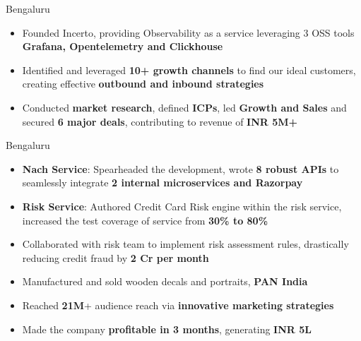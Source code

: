 \documentclass[10pt,a4paper]{altacv}
\begin{document}
  {Bengaluru}
\begin{itemize}
\item Founded Incerto, providing Observability as a service leveraging 3 OSS tools \textbf{Grafana, Opentelemetry and Clickhouse}
\item Identified and leveraged \textbf{10+ growth channels} to find our ideal customers, creating effective \textbf{outbound and inbound strategies}
\item Conducted \textbf{market research}, defined \textbf{ICPs}, led \textbf{Growth and Sales} and secured \textbf{6 major deals}, contributing to revenue of \textbf{INR 5M+}
\end{itemize}

  {Bengaluru}
\begin{itemize}
\item \textbf{Nach Service}: Spearheaded the development, wrote \textbf{8 robust APIs} to seamlessly integrate \textbf{2 internal microservices and Razorpay}
\item \textbf{Risk Service}: Authored Credit Card Risk engine within the risk service, increased the test coverage of service from \textbf{30\% to 80\%}
\item Collaborated with risk team to implement risk assessment rules, drastically reducing credit fraud by \textbf{2 Cr per month}
\end{itemize}

\begin{itemize}
\item Manufactured and sold wooden decals and portraits,\textbf{ PAN India}
\item Reached \textbf{21M}+ audience reach via \textbf{innovative marketing strategies}
\item Made the company \textbf{profitable in 3 months}, generating \textbf{INR 5L}
\end{itemize}
\end{document}
